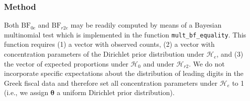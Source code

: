 \documentclass[
  english,
  man,floatsintext]{apa6}
\newenvironment{Shaded}{\begin{snugshade}}{\end{snugshade}}
\newcommand{\CommentTok}[1]{\textcolor[rgb]{0.56,0.35,0.01}{\textit{#1}}}
\newcommand{\DataTypeTok}[1]{\textcolor[rgb]{0.13,0.29,0.53}{#1}}
\newcommand{\DecValTok}[1]{\textcolor[rgb]{0.00,0.00,0.81}{#1}}
\newcommand{\KeywordTok}[1]{\textcolor[rgb]{0.13,0.29,0.53}{\textbf{#1}}}
\newcommand{\NormalTok}[1]{#1}
\newcommand{\OperatorTok}[1]{\textcolor[rgb]{0.81,0.36,0.00}{\textbf{#1}}}
\newcommand{\StringTok}[1]{\textcolor[rgb]{0.31,0.60,0.02}{#1}}
\begin{document}
\hypertarget{method}{%
\subsubsection{Method}\label{method}}

Both \(\text{BF}_{0e}\) and \(\text{BF}_{r2e}\) may be readily computed by means of a Bayesian multinomial test which is implemented in the function \texttt{mult\_bf\_equality}. This function requires (1) a vector with observed counts, (2) a vector with concentration parameters of the Dirichlet prior distribution under \(\mathcal{H}_e\), and (3) the vector of expected proportions under \(\mathcal{H}_0\) and under \(\mathcal{H}_{r2}\). We do not incorporate specific expectations about the distribution of leading digits in the Greek fiscal data and therefore set all concentration parameters under \(\mathcal{H}_e\) to 1 (i.e., we assign \(\boldsymbol{\theta}\) a uniform Dirichlet prior distribution).

\begin{Shaded}
\end{Shaded}
\end{document}
